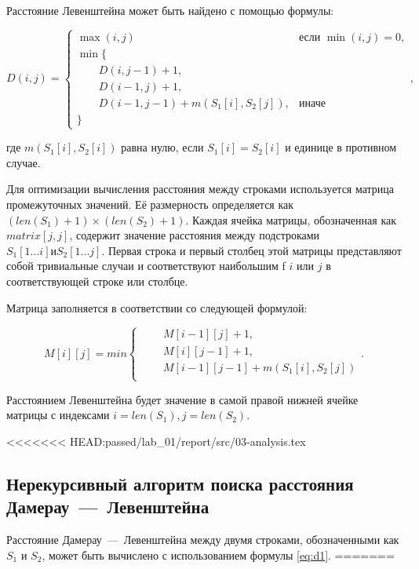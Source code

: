 Расстояние Левенштейна может быть найдено с помощью формулы:

\begin{equation}
	\label{eq:d}
	D(i, j) = \begin{cases} 
		\max(i, j) &\text{если }\min(i, j) = 0, \\
		\min \lbrace \\
	     \qquad D(i, j-1) + 1, \\
	     \qquad D(i-1, j) + 1, \\
	     \qquad D(i-1, j-1) + m(S_{1}[i], S_{2}[j]), &\text{иначе} \\
	     \rbrace
	\end{cases},
\end{equation}

где $m(S_{1}[i], S_{2}[i])$ равна нулю, если $S_{1}[i] = S_{2}[i]$ и единице в противном случае.

Для оптимизации вычисления расстояния между строками используется матрица промежуточных значений. Её размерность определяется как $(len(S_{1}) + 1) × (len(S_{2}) + 1)$.
Каждая ячейка матрицы, обозначенная как $matrix[j, j]$, содержит значение расстояния между подстроками $S_{1}[1...i] и S_{2}[1...j]$. 
Первая строка и первый столбец этой матрицы представляют собой тривиальные случаи и соответствуют наибольшим f $i$ или $j$ в соответствующей строке или столбце.

Матрица заполняется в соответствии со следующей формулой:

\begin{equation}
	\label{eq:mat}
	M[i][j] = min \begin{cases}
		\qquad M[i-1][j] + 1,\\
		\qquad M[i][j-1] + 1,\\
		\qquad M[i-1][j-1] + m(S_{1}[i], S_{2}[j])\\
	\end{cases}.
\end{equation}

Расстоянием Левенштейна будет значение в самой правой нижней ячейке матрицы с индексами $i = len(S_{1}), j = len(S_{2})$.

<<<<<<< HEAD:passed/lab_01/report/src/03-analysis.tex
\subsection{Нерекурсивный алгоритм поиска расстояния Дамерау~---~Левенштейна}

Расстояние Дамерау~---~Левенштейна между двумя строками, обозначенными как $S_1$ и $S_2$, может быть вычислено с использованием формулы \ref{eq:d1}. 
=======
